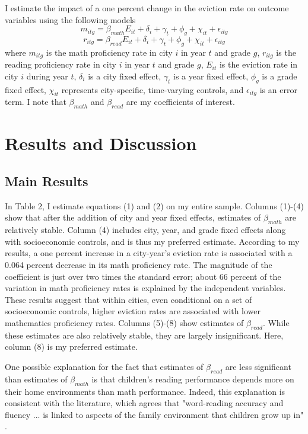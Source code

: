 \documentclass[12pt]{article}
\begin{document}
I estimate the impact of a one percent change in the eviction rate on outcome variables using the following models
\begin{equation}
m_{itg} = \beta_{math} E_{it} + \delta_i + \gamma_t + \phi_g + \chi_{it} + \epsilon_{itg}
\end{equation}
\begin{equation}
r_{itg} = \beta_{read} E_{it} + \delta_i + \gamma_t + \phi_g + \chi_{it} + \epsilon_{itg}
\end{equation}
where $m_{itg}$ is the math proficiency rate in city $i$ in year $t$ and grade $g$, $r_{itg}$ is the reading proficiency rate in city $i$ in year $t$ and grade $g$, $E_{it}$ is the eviction rate in  city $i$ during year $t$, $\delta_i$ is a city fixed effect, $\gamma_t$ is a year fixed effect, $\phi_g$ is a grade fixed effect, $\chi_{it}$ represents city-specific, time-varying controls, and $\epsilon_{itg}$ is an error term. I note that $\beta_{math}$ and $\beta_{read}$ are my coefficients of interest.


\section{Results and Discussion} \label{sec:result}
\subsection{Main Results}
In Table 2, I estimate equations (1) and (2) on my entire sample. Columns (1)-(4) show that after the addition of city and year fixed effects, estimates of $\beta_{math}$ are relatively stable. Column (4) includes city, year, and grade fixed effects along with socioeconomic controls, and is thus my preferred estimate. According to my results, a one percent increase in a city-year's eviction rate is associated with a 0.064 percent decrease in its math proficiency rate. The magnitude of the coefficient is just over two times the standard error; about 66 percent of the variation in math proficiency rates is explained by the independent variables. These results suggest that within cities, even conditional on a set of socioeconomic controls, higher eviction rates are associated with lower mathematics proficiency rates. Columns (5)-(8) show estimates of $\beta_{read}$. While these estimates are also relatively stable, they are largely insignificant. Here, column (8) is my preferred estimate.
    
One possible explanation for the fact that estimates of $\beta_{read}$ are less significant than estimates of $\beta_{math}$ is that children's reading performance depends more on their home environments than math performance. Indeed, this explanation is consistent with the literature, which agrees that "word-reading accuracy and fluency ... is linked to aspects of the family environment that children grow up in" \citep{van_bergen_why_2017}.
\end{document}
